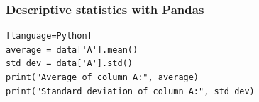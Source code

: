 \documentclass{beamer}
\begin{document}
    \begin{frame}[fragile]
    \frametitle{Descriptive statistics with Pandas}
    \begin{lstlisting}[caption=Calculating the average and standard deviation of a column using Pandas][language=Python]
average = data['A'].mean()
std_dev = data['A'].std()
print("Average of column A:", average)
print("Standard deviation of column A:", std_dev)
    \end{lstlisting}
    \end{frame}







\end{document}
